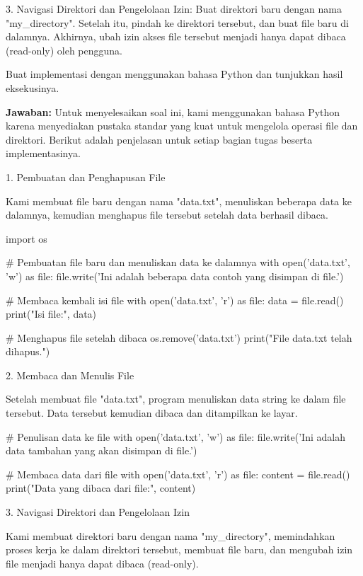 \documentclass[12pt]{article}
\begin{document}
3. Navigasi Direktori dan Pengelolaan Izin: Buat direktori baru dengan nama "my\_directory". Setelah itu, pindah ke direktori tersebut, dan buat file baru di dalamnya. Akhirnya, ubah izin akses file tersebut menjadi hanya dapat dibaca (read-only) oleh pengguna.

Buat implementasi dengan menggunakan bahasa Python dan tunjukkan hasil eksekusinya.

\textbf{Jawaban:}
Untuk menyelesaikan soal ini, kami menggunakan bahasa Python karena menyediakan pustaka standar yang kuat untuk mengelola operasi file dan direktori. Berikut adalah penjelasan untuk setiap bagian tugas beserta implementasinya.

1. Pembuatan dan Penghapusan File

   Kami membuat file baru dengan nama "data.txt", menuliskan beberapa data ke dalamnya, kemudian menghapus file tersebut setelah data berhasil dibaca.

\begin{python}
import os

# Pembuatan file baru dan menuliskan data ke dalamnya
with open('data.txt', 'w') as file:
    file.write('Ini adalah beberapa data contoh yang disimpan di file.')

# Membaca kembali isi file
with open('data.txt', 'r') as file:
    data = file.read()
    print("Isi file:", data)

# Menghapus file setelah dibaca
os.remove('data.txt')
print("File data.txt telah dihapus.")
\end{python}

2. Membaca dan Menulis File

   Setelah membuat file "data.txt", program menuliskan data string ke dalam file tersebut. Data tersebut kemudian dibaca dan ditampilkan ke layar.

\begin{python}
# Penulisan data ke file
with open('data.txt', 'w') as file:
    file.write('Ini adalah data tambahan yang akan disimpan di file.')

# Membaca data dari file
with open('data.txt', 'r') as file:
    content = file.read()
    print("Data yang dibaca dari file:", content)
\end{python}

3. Navigasi Direktori dan Pengelolaan Izin

   Kami membuat direktori baru dengan nama "my\_directory", memindahkan proses kerja ke dalam direktori tersebut, membuat file baru, dan mengubah izin file menjadi hanya dapat dibaca (read-only).
\end{document}
